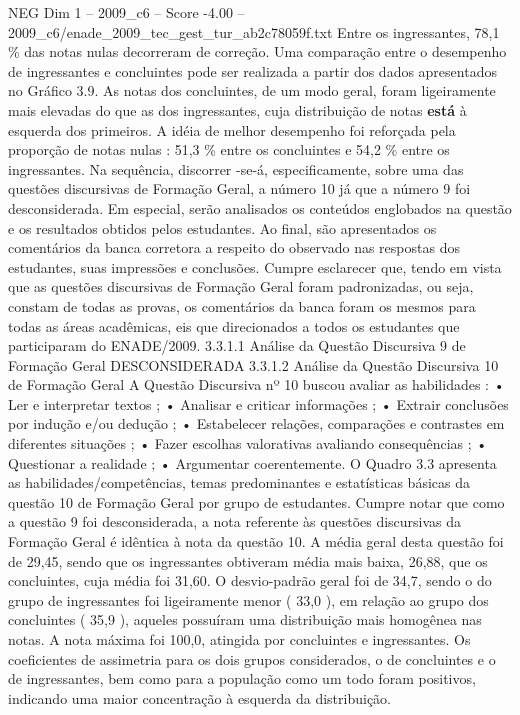 \begin{textsample}{NEG Dim 1 – 2009\_c6 – Score -4.00 – 2009\_c6/enade\_2009\_tec\_gest\_tur\_ab2c78059f.txt}
Entre os ingressantes, 78,1 \% das notas nulas decorreram de correção.
Uma comparação entre o desempenho de ingressantes e concluintes pode ser realizada a partir dos dados apresentados no Gráfico 3.9.
As notas dos concluintes, de um modo geral, foram ligeiramente mais elevadas do que as dos ingressantes, cuja distribuição de notas \textbf{está} à esquerda dos primeiros.
A idéia de melhor desempenho foi reforçada pela proporção de notas nulas : 51,3 \% entre os concluintes e 54,2 \% entre os ingressantes.
Na sequência, discorrer -se-á, especificamente, sobre uma das questões discursivas de Formação Geral, a número 10 já que a número 9 foi desconsiderada.
Em especial, serão analisados os conteúdos englobados na questão e os resultados obtidos pelos estudantes.
Ao final, são apresentados os comentários da banca corretora a respeito do observado nas respostas dos estudantes, suas impressões e conclusões.
Cumpre esclarecer que, tendo em vista que as questões discursivas de Formação Geral foram padronizadas, ou seja, constam de todas as provas, os comentários da banca foram os mesmos para todas as áreas acadêmicas, eis que direcionados a todos os estudantes que participaram do ENADE/2009. 3.3.1.1 Análise da Questão Discursiva 9 de Formação Geral DESCONSIDERADA 3.3.1.2 Análise da Questão Discursiva 10 de Formação Geral A Questão Discursiva nº 10 buscou avaliar as habilidades : • Ler e interpretar textos ; • Analisar e criticar informações ; • Extrair conclusões por indução e/ou dedução ; • Estabelecer relações, comparações e contrastes em diferentes situações ; • Fazer escolhas valorativas avaliando consequências ; • Questionar a realidade ; • Argumentar coerentemente.
O Quadro 3.3 apresenta as habilidades/competências, temas predominantes e estatísticas básicas da questão 10 de Formação Geral por grupo de estudantes.
Cumpre notar que como a questão 9 foi desconsiderada, a nota referente às questões discursivas da Formação Geral é idêntica à nota da questão 10.
A média geral desta questão foi de 29,45, sendo que os ingressantes obtiveram média mais baixa, 26,88, que os concluintes, cuja média foi 31,60.
O desvio-padrão geral foi de 34,7, sendo o do grupo de ingressantes foi ligeiramente menor ( 33,0 ), em relação ao grupo dos concluintes ( 35,9 ), aqueles possuíram uma distribuição mais homogênea nas notas.
A nota máxima foi 100,0, atingida por concluintes e ingressantes.
Os coeficientes de assimetria para os dois grupos considerados, o de concluintes e o de ingressantes, bem como para a população como um todo foram positivos, indicando uma maior concentração à esquerda da distribuição.

\end{textsample}

